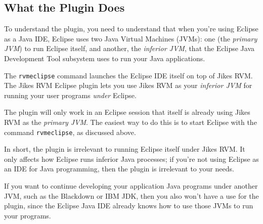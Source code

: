\subsection{What the Plugin Does}

To understand the plugin, you need to understand that when you're
using Eclipse as a Java IDE, Eclipse uses two Java Virtual Machines
(JVMs): one (the {\em primary JVM}) to run Eclipse itself, and
another, the {\em inferior JVM}, that the Eclipse Java Development
Tool subsystem uses to run your Java applications.

The {\tt rvmeclipse} command launches the Eclipse IDE itself on top of
Jikes RVM.  The Jikes RVM Eclipse plugin lets you use Jikes RVM as
your {\em inferior JVM} for running your user programs {\em under} Eclipse.

The plugin will only work in an Eclipse session that itself is already
using Jikes RVM as the {\em primary JVM}.  The easiest way to do this
is to start Eclipse with the command {\tt rvmeclipse}, as discussed
above.

In short, the plugin is irrelevant to running Eclipse itself under
Jikes RVM.  It only affects how Eclipse runs inferior Java processes;
if you're not using Eclipse as an IDE for Java programming, then
the plugin is irrelevant to your needs.

If you want to continue developing your application Java programs
under another JVM, such as the Blackdown or IBM JDK, then you also
won't have a use for the plugin, since the Eclipse Java IDE already
knows how to use those JVMs to run your programs.

